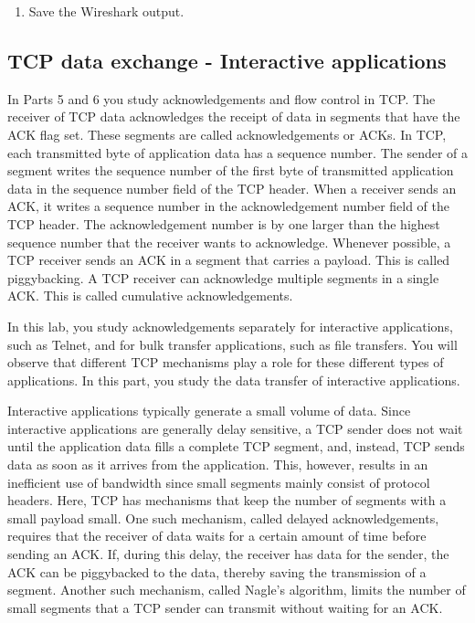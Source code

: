 \begin{questions}
\end{questions}

\begin{enumerate}[resume]
	\item Save the Wireshark output.
\end{enumerate}

\newpage
\subsection{TCP data exchange - Interactive applications}

In Parts 5 and 6 you study acknowledgements and flow control in TCP. The receiver of TCP data acknowledges the receipt of data in segments that have the ACK flag set. These segments are called acknowledgements or ACKs. In TCP, each transmitted byte of application data has a sequence number. The sender of a segment writes the sequence number of the first byte of transmitted application data in the sequence number field of the TCP header. When a receiver sends an ACK, it writes a sequence number in the acknowledgement number field of the TCP header. The acknowledgement number is by one larger than the highest sequence number that the receiver wants to acknowledge. Whenever possible, a TCP receiver sends an ACK in a segment that carries a payload. This is called piggybacking. A TCP receiver can acknowledge multiple segments in a single ACK. This is called cumulative acknowledgements.

In this lab, you study acknowledgements separately for interactive applications, such as Telnet, and for bulk transfer applications, such as file transfers. You will observe that different TCP mechanisms play a role for these different types of applications. In this part, you study the data transfer of interactive applications.

Interactive applications typically generate a small volume of data. Since interactive applications are generally delay sensitive, a TCP sender does not wait until the application data fills a complete TCP segment, and, instead, TCP sends data as soon as it arrives from the application. This, however, results in an inefficient use of bandwidth since small segments mainly consist of protocol headers. Here, TCP has mechanisms that keep the number of segments with a small payload small. One such mechanism, called delayed acknowledgements, requires that the receiver of data waits for a certain amount of time before sending an ACK. If, during this delay, the receiver has data for the sender, the ACK can be piggybacked to the data, thereby saving the transmission of a segment. Another such mechanism, called Nagle’s algorithm, limits the number of small segments that a TCP sender can transmit without waiting for an ACK.

